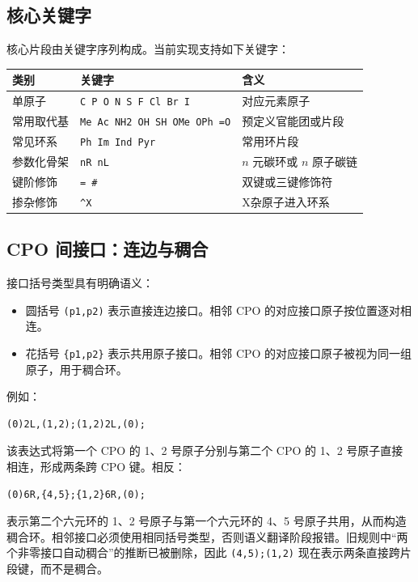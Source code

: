 \documentclass[UTF8,a4paper,11pt]{ctexart}
\begin{document}
\subsection{核心关键字}

核心片段由关键字序列构成。当前实现支持如下关键字：

\begin{table}[h]
\centering
\begin{tabular}{lll}
\toprule
类别 & 关键字 & 含义 \\
\midrule
单原子 & \verb|C P O N S F Cl Br I| & 对应元素原子 \\
常用取代基 & \verb|Me Ac NH2 OH SH OMe OPh =O| & 预定义官能团或片段 \\
常见环系 & \verb|Ph Im Ind Pyr| & 常用环片段 \\
参数化骨架 & \verb|nR nL| & $n$ 元碳环或 $n$ 原子碳链 \\
键阶修饰 & \verb|= #| & 双键或三键修饰符 \\
掺杂修饰 & \verb|^X| & X杂原子进入环系 \\
\bottomrule
\end{tabular}
\end{table}


\subsection{CPO 间接口：连边与稠合}

接口括号类型具有明确语义：
\begin{itemize}[leftmargin=2em]
  \item 圆括号 \verb|(p1,p2)| 表示直接连边接口。相邻 CPO 的对应接口原子按位置逐对相连。
  \item 花括号 \verb|{p1,p2}| 表示共用原子接口。相邻 CPO 的对应接口原子被视为同一组原子，用于稠合环。
\end{itemize}

例如：

\begin{lstlisting}[language=mychem]
(0)2L,(1,2);(1,2)2L,(0);
\end{lstlisting}

该表达式将第一个 CPO 的 1、2 号原子分别与第二个 CPO 的 1、2 号原子直接相连，形成两条跨 CPO 键。相反：

\begin{lstlisting}[language=mychem]
(0)6R,{4,5};{1,2}6R,(0);
\end{lstlisting}

表示第二个六元环的 1、2 号原子与第一个六元环的 4、5 号原子共用，从而构造稠合环。相邻接口必须使用相同括号类型，否则语义翻译阶段报错。旧规则中“两个非零接口自动稠合”的推断已被删除，因此 \verb|(4,5);(1,2)| 现在表示两条直接跨片段键，而不是稠合。
\end{document}
